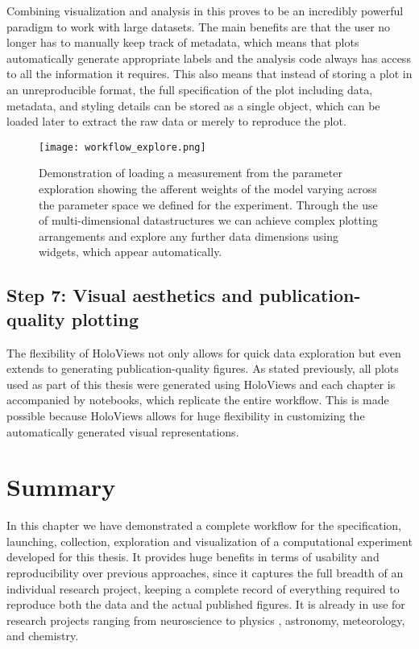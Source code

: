 Combining visualization and analysis in this proves to be an
incredibly powerful paradigm to work with large datasets. The main
benefits are that the user no longer has to manually keep track of
metadata, which means that plots automatically generate appropriate
labels and the analysis code always has access to all the information
it requires. This also means that instead of storing a plot in an
unreproducible format, the full specification of the plot including
data, metadata, and styling details can be stored as a single object,
which can be loaded later to extract the raw data or merely to
reproduce the plot.

\begin{figure}
	\centering
        \texttt{[image: workflow\_explore.png]}
	\caption[Demonstration of complex parameter exploration in
      HoloViews.]{Demonstration of loading a measurement from the
      parameter exploration showing the afferent weights of the model
      varying across the parameter space we defined for the
      experiment. Through the use of multi-dimensional datastructures
      we can achieve complex plotting arrangements and explore any
      further data dimensions using widgets, which appear
      automatically.}
	\label{workflow_explore}
\end{figure}

\subsection{Step 7: Visual aesthetics and publication-quality plotting}

The flexibility of HoloViews not only allows for quick data
exploration but even extends to generating publication-quality
figures. As stated previously, all plots used as part of this thesis
were generated using HoloViews and each chapter is accompanied by
notebooks, which replicate the entire workflow. This is made possible
because HoloViews allows for huge flexibility in customizing the
automatically generated visual representations.

\section{Summary}

In this chapter we have demonstrated a complete workflow for the
specification, launching, collection, exploration and visualization of
a computational experiment developed for this thesis. It provides huge
benefits in terms of usability and reproducibility over previous
approaches, since it captures the full breadth of an individual
research project, keeping a complete record of everything required to
reproduce both the data and the actual published figures.  It is
already in use for research projects ranging from
neuroscience \citep{Keemink2015} to physics \citep{Nijholt2015,
  Tenner2016}, astronomy, meteorology, and chemistry.

